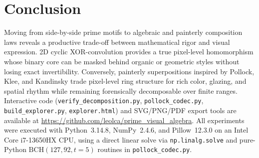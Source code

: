 \documentclass[]{interact}
\theoremstyle{plain}
\theoremstyle{definition}
\theoremstyle{remark}
\begin{document}
\section{Conclusion}
Moving from side-by-side prime motifs to algebraic and painterly composition laws reveals a productive trade-off between mathematical rigor and visual expression. 2D cyclic XOR-convolution provides a true pixel-level homomorphism whose binary core can be masked behind organic or geometric styles without losing exact invertibility. Conversely, painterly superpositions inspired by Pollock, Klee, and Kandinsky trade pixel-level ring structure for rich color, glazing, and spatial rhythm while remaining forensically decomposable over finite ranges. Interactive code (\texttt{verify\_decomposition.py}, \texttt{pollock\_codec.py}, \texttt{build\_explorer.py}, \texttt{explorer.html}) and SVG/PNG/PDF export tools are available at \url{https://github.com/leolca/prime_visual_algebra}. All experiments were executed with Python~3.14.8, NumPy~2.4.6, and Pillow~12.3.0 on an Intel Core i7-13650HX CPU, using a direct linear solve via \texttt{np.linalg.solve} and pure-Python $\mathrm{BCH}(127,92,t=5)$ routines in \texttt{pollock\_codec.py}.



\end{document}
